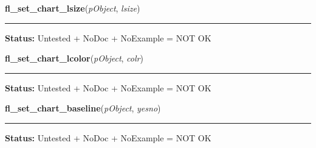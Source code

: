     \label{xformslib:library:fl_set_chart_lsize}

    \vspace{0.5ex}

\hspace{.8\funcindent}\begin{boxedminipage}{\funcwidth}

    \raggedright \textbf{fl\_set\_chart\_lsize}(\textit{pObject}, \textit{lsize})

    \vspace{-1.5ex}

    \rule{\textwidth}{0.5\fboxrule}
\setlength{\parskip}{2ex}
\setlength{\parskip}{1ex}
\textbf{Status:} Untested + NoDoc + NoExample = NOT OK



    \end{boxedminipage}

    \label{xformslib:library:fl_set_chart_lcolor}

    \vspace{0.5ex}

\hspace{.8\funcindent}\begin{boxedminipage}{\funcwidth}

    \raggedright \textbf{fl\_set\_chart\_lcolor}(\textit{pObject}, \textit{colr})

    \vspace{-1.5ex}

    \rule{\textwidth}{0.5\fboxrule}
\setlength{\parskip}{2ex}
\setlength{\parskip}{1ex}
\textbf{Status:} Untested + NoDoc + NoExample = NOT OK



    \end{boxedminipage}

    \label{xformslib:library:fl_set_chart_baseline}

    \vspace{0.5ex}

\hspace{.8\funcindent}\begin{boxedminipage}{\funcwidth}

    \raggedright \textbf{fl\_set\_chart\_baseline}(\textit{pObject}, \textit{yesno})

    \vspace{-1.5ex}

    \rule{\textwidth}{0.5\fboxrule}
\setlength{\parskip}{2ex}
\setlength{\parskip}{1ex}
\textbf{Status:} Untested + NoDoc + NoExample = NOT OK



    \end{boxedminipage}

